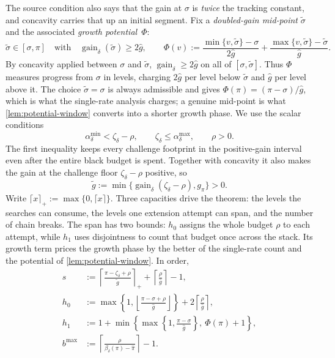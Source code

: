 \documentclass[11pt]{article}
\theoremstyle{plain}
\theoremstyle{remark}
\newcommand{\gaind}{\operatorname{gain}_{\delta}}
\newcommand{\gpi}{g_{\pi}}
\newcommand{\ghat}{\widehat g}
\newcommand{\gtilde}{\widetilde g}
\newcommand{\pihat}{\widehat{\pi}}
\newcommand{\sigmatilde}{\widetilde{\sigma}}
\newcommand{\Pot}{\Phi}
\begin{document}
The source condition also says that the gain at \(\sigma\) is \emph{twice} the tracking
constant, and concavity carries that up an initial segment.  Fix a \emph{doubled-gain
mid-point} \(\sigmatilde\) and the associated \emph{growth potential}~\(\Pot\):
\begin{equation}
 \sigmatilde\in[\sigma,\pi]
 \quad\text{with}\quad
 \gaind(\sigmatilde)\ge2\ghat ,
 \qquad
 \Pot(v):=\frac{\min\{v,\sigmatilde\}-\sigma}{2\ghat}
           +\frac{\max\{v,\sigmatilde\}-\sigmatilde}{\ghat} .
 \label{eq:midpoint}
\end{equation}
By concavity applied between \(\sigma\) and \(\sigmatilde\), \(\gaind\ge2\ghat\) on all of
\([\sigma,\sigmatilde]\).  Thus \(\Pot\) measures progress from \(\sigma\) in levels,
charging \(2\ghat\) per level below \(\sigmatilde\) and \(\ghat\) per level above it.
The choice \(\sigmatilde=\sigma\) is always admissible and gives
\(\Pot(\pi)=(\pi-\sigma)/\ghat\), which
is what the single-rate analysis charges; a genuine mid-point is what
\cref{lem:potential-window} converts into a shorter growth phase.  We use the scalar
conditions
\begin{equation}
 \alpha_\delta^{\min}<\zeta_\delta-\rho,\qquad
 \zeta_\delta\le\alpha_\delta^{\max},\qquad \rho>0.
 \label{eq:scalar-conditions}
\end{equation}
The first inequality keeps every challenge footprint in the positive-gain interval
even after the entire black budget is spent.  Together with concavity it also
makes the gain at the challenge floor \(\zeta_\delta-\rho\) positive, so
\begin{equation}
 \gtilde:=\min\{\gaind(\zeta_\delta-\rho),\gpi\}>0 .
 \label{eq:gzeta}
\end{equation}
Write \(\lceil x\rceil_+:=\max\{0,\lceil x\rceil\}\).  Three capacities drive the
theorem: the levels the searches can consume, the levels one extension attempt can
span, and the number of chain breaks.  The span has two bounds: \(h_0\) assigns the
whole budget \(\rho\) to each attempt, while \(h_1\) uses disjointness to count that
budget once across the stack.  Its growth term prices the growth phase by the better of
the single-rate count and the potential of \cref{lem:potential-window}.  In order,
\begin{align}
 s&:=\left\lceil\frac{\pi-\zeta_\delta+\rho}{\gtilde}\right\rceil_+
  +\left\lceil\frac{\rho}{\ghat}\right\rceil-1,
 \label{eq:cap-search}\\
 h_0&:=\max\left\{1,
   \left\lfloor\frac{\pi-\sigma+\rho}{\ghat}\right\rfloor\right\}
  +2\left\lceil\frac{\rho}{\ghat}\right\rceil,
 \label{eq:cap-span}\\
 h_1&:=1+\min\left\{\max\left\{1,\frac{\pi-\sigma}{\ghat}\right\},\
   \Pot(\pi)+1\right\},
 \label{eq:cap-span-global}\\
 b^{\max}&:=\left\lceil\frac{\rho}{\beta_\delta(\pi)-\pihat}\right\rceil-1.
 \label{eq:cap-break}
\end{align}
\end{document}
